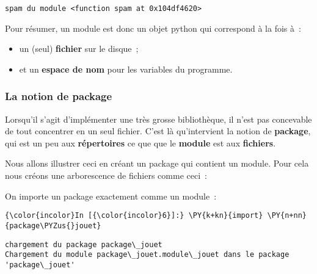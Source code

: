     \begin{Verbatim}[commandchars=\\\{\},frame=single,framerule=0.3mm,rulecolor=\color{cellframecolor}]
spam du module <function spam at 0x104df4620>
\end{Verbatim}

    Pour résumer, un module est donc un objet python qui correspond à la
fois à~:

\begin{itemize}
\tightlist
\item
  un (seul) \textbf{fichier} sur le disque~;
\item
  et un \textbf{espace de nom} pour les variables du programme.
\end{itemize}

    \hypertarget{la-notion-de-package}{%
\subsubsection{La notion de package}\label{la-notion-de-package}}

    Lorsqu'il s'agit d'implémenter une très grosse bibliothèque, il n'est
pas concevable de tout concentrer en un seul fichier. C'est là
qu'intervient la notion de \textbf{package}, qui est un peu aux
\textbf{répertoires} ce que que le \textbf{module} est aux
\textbf{fichiers}.

    Nous allons illustrer ceci en créant un package qui contient un module.
Pour cela nous créons une arborescence de fichiers comme ceci~:

\begin{Shaded}
\begin{Highlighting}[frame=lines,framerule=0.6mm,rulecolor=\color{asisframecolor}]
\end{Highlighting}
\end{Shaded}

    On importe un package exactement comme un module~:

    \begin{Verbatim}[commandchars=\\\{\},frame=single,framerule=0.3mm,rulecolor=\color{cellframecolor}]
{\color{incolor}In [{\color{incolor}6}]:} \PY{k+kn}{import} \PY{n+nn}{package\PYZus{}jouet}
\end{Verbatim}


    \begin{Verbatim}[commandchars=\\\{\},frame=single,framerule=0.3mm,rulecolor=\color{cellframecolor}]
chargement du package package\_jouet
Chargement du module package\_jouet.module\_jouet dans le package 'package\_jouet'
\end{Verbatim}

